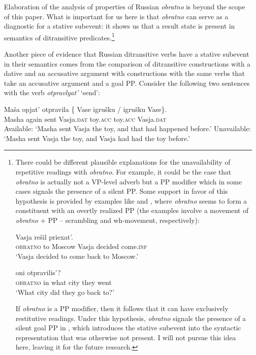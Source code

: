 \documentclass[output=paper]{langscibook}
\begin{document}
\noindent Elaboration of the analysis of properties of Russian \textit{obratno} is beyond the scope of this paper. What is important for us here is that \textit{obratno} can serve as a diagnostic for a stative subevent: it shows us that a result state is present in semantics of ditransitive predicates.\footnote{There
  could be different plausible explanations for the unavailability of repetitive readings with \textit{obratno}. For example, it could be the case that \textit{obratno} is actually not a VP-level adverb but a PP modifier which in some cases signals the presence of a silent PP. Some support in favor of this hypothesis is provided by examples like  and , where \textit{obratno} seems to form a constituent with an overtly realized PP (the examples involve a movement of \textit{obratno} + PP -- scrambling and wh-movement, respectively):

  \ea\label{ex:bondarenko:fn9i}
   Vasja rešil priexat’.\\
  {} \textsc{obratno} to Moscow Vasja decided come.\textsc{inf}\\
  \glt `Vasja decided to come back to Moscow.'
  \z

  \ea\label{ex:bondarenko:fn9ii}
     oni otpravilis’?\\
    {} \textsc{obratno} in what city they went\\
    \glt `What city did they go back to?'
    \z
    
    \noindent If \textit{obratno} is a PP modifier, then it follows that it can have exclusively restitutive readings. Under this hypothesis, \textit{obratno} signals the presence of a silent goal PP in , which introduces the stative subevent into the syntactic representation that was otherwise not present. I will not pursue this idea here, leaving it for the future research.
    }

Another piece of evidence that Russian ditransitive verbs have a stative sub\-event in their semantics comes from the comparison of ditransitive constructions with a dative and an accusative argument with constructions with the same verbs that take an accusative argument and a goal PP. Consider the following two sentences with the verb \textit{otpravlyat’} ‘send’:


 \ea\label{ex:bondarenko:21}
\gll Maša opjat’ otpravila \{\hspace{-2pt} Vase igrušku / igrušku Vase\}.\\
     Masha again sent {} Vasja.\textsc{dat} toy.\textsc{acc} {} toy.\textsc{acc} Vasja.\textsc{dat}\\
\ea  Available: `Masha sent Vasja the toy, and that had happened before.'
\ex Unavailable: `Masha sent Vasja the toy, and Vasja had had the toy before.'
\z
\z
\end{document}
